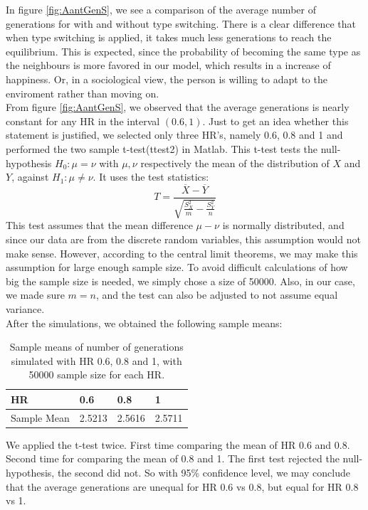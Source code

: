 In figure \ref{fig:AantGenS}, we see a comparison of the average number of generations for with and without type switching. 
There is a clear difference that when type switching is applied, it takes much less generations to reach the equilibrium. 
This is expected, since the probability of becoming the same type as the neighbours is more favored in our model, which results in a increase of happiness. 
Or, in a sociological view, the person is willing to adapt to the enviroment rather than moving on.\\

From figure \ref{fig:AantGenS}, we observed that the average generations is nearly constant for any HR in the interval \((0.6,1)\). 
Just to get an idea whether this statement is justified, we selected only three HR's, namely 0.6, 0.8 and 1 and performed the two sample t-test(ttest2) in Matlab. 
This t-test tests the null-hypothesis $H_0:\mu=\nu$ with $\mu,\nu$ respectively the mean of the distribution of $X$ and $Y$, against $H_1:\mu\neq\nu$. It uses the test statistics:
 \[T=\frac{\overline{X}-\overline{Y}}{\sqrt{\frac{S^2_X}{m}-\frac{S^2_Y}{n}}}\]
This test assumes that the mean difference $\mu-\nu$ is normally distributed, and since our data are from the discrete random variables, this assumption would not make sense. 
However, according to the central limit theorems, we may make this assumption for large enough sample size. 
To avoid difficult calculations of how big the sample size is needed, we simply chose a size of 50000. 
Also, in our case, we made sure $m=n$, and the test can also be adjusted to not assume equal variance.\\

After the simulations, we obtained the following sample means:
\begin{table}[htp]
\centering
\caption{Sample means of number of generations simulated with HR 0.6, 0.8 and 1, with 50000 sample size for each HR.}
\begin{tabular}{|l|l|l|l|}
\hline
 HR&0.6&0.8&1 \\ \hline
 Sample Mean&2.5213&2.5616&2.5711  \\ \hline 
\end{tabular}
\end{table}
We applied the t-test twice. 
First time comparing the mean of HR 0.6 and 0.8. 
Second time for comparing the mean of 0.8 and 1. 
The first test rejected the null-hypothesis, the second did not. 
So with 95\% confidence level, we may conclude that the average generations are unequal for HR 0.6 vs 0.8, but equal for HR 0.8 vs 1.\\

